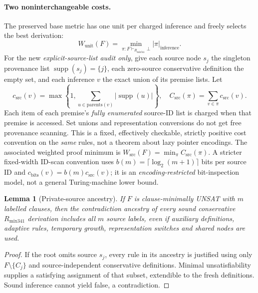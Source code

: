 \documentclass[11pt]{article}
\newtheorem{lemma}{Lemma}
\newcommand{\supp}{\operatorname{supp}}
\begin{document}
\paragraph{Two noninterchangeable costs.}
The preserved base metric has one unit per charged inference and freely selects the best derivation:
\[
 W_{\mathrm{unit}}(F)=\min_{\pi:F\vdash_{R_{\mathrm{mix341}}}\bot}|\pi|_{\mathrm{inference}}.
\]
For the new \emph{explicit-source-list audit only}, give each source node $s_j$ the singleton provenance list $\supp(s_j)=\{j\}$, each zero-source conservative definition the empty set, and each inference $v$ the exact union of its premise lists. Let
\[
 c_{\mathrm{src}}(v)=\max\left\{1,\sum_{u\in\mathrm{parents}(v)}|\supp(u)|\right\},
 \quad
 C_{\mathrm{src}}(\pi)=\sum_{v\in\pi}c_{\mathrm{src}}(v).
\]
Each item of each premise's \emph{fully enumerated} source-ID list is charged when that premise is accessed. Set unions and representation conversions do not get free provenance scanning. This is a fixed, effectively checkable, strictly positive cost convention on the \emph{same} rules, not a theorem about lazy pointer encodings. The associated weighted proof minimum is $W_{\mathrm{src}}(F)=\min_\pi C_{\mathrm{src}}(\pi)$. A stricter fixed-width ID-scan convention uses $b(m)=\lceil\log_2(m+1)\rceil$ bits per source ID and $c_{\mathrm{bits}}(v)=b(m)c_{\mathrm{src}}(v)$; it is an \emph{encoding-restricted} bit-inspection model, not a general Turing-machine lower bound.

\begin{lemma}[Private-source ancestry]
If $F$ is clause-minimally UNSAT with $m$ labelled clauses, then the contradiction ancestry of \emph{every} sound conservative $R_{\mathrm{mix341}}$ derivation includes all $m$ source labels, even if auxiliary definitions, adaptive rules, temporary growth, representation switches and shared nodes are used.
\end{lemma}
\begin{proof}
If the root omits source $s_j$, every rule in its ancestry is justified using only $F\setminus\{C_j\}$ and source-independent conservative definitions. Minimal unsatisfiability supplies a satisfying assignment of that subset, extendible to the fresh definitions. Sound inference cannot yield false, a contradiction.
\end{proof}
\end{document}
